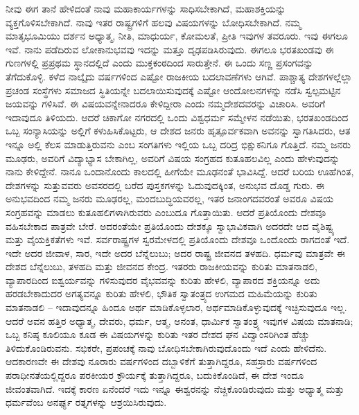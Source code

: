 ನೀವು ಈಗ ತಾನೆ ಹೇಳಿದಂತೆ ನಾವು ಮಹಾಕಾರ್ಯಗಳನ್ನು ಸಾಧಿಸಬೇಕಾಗಿದೆ, ಮಹಾಶಕ್ತಿಯನ್ನು ವ್ಯಕ್ತಗೊಳಿಸಬೇಕಾಗಿದೆ. ನಾವು ಇತರ ರಾಷ್ಟ್ರಗಳಿಗೆ ಹಲವು ವಿಷಯಗಳನ್ನು ಬೋಧಿಸಬೇಕಾಗಿದೆ. ನಮ್ಮ ಮಾತೃಭೂಮಿಯು ದರ್ಶನ ಅಧ್ಯಾತ್ಮ, ನೀತಿ, ಮಾಧುರ್ಯ, ಕೋಮಲತೆ, ಪ್ರೀತಿ ಇವುಗಳ ತವರೂರು. ಇವು ಈಗಲೂ ಇವೆ. ನಾನು ಪಡೆದಿರುವ ಲೋಕಾನುಭವವು ಇದನ್ನು ಮತ್ತೂ ದೃಢಪಡಿಸಿರುವುದು. ಈಗಲೂ ಭರತಖಂಡವು ಈ ಗುಣಗಳಲ್ಲಿ ಪ್ರಪ್ರಥಮ ಸ್ಥಾನದಲ್ಲಿದೆ ಎಂದು ಮುಕ್ತಕಂಠದಿಂದ ಸಾರುತ್ತೇನೆ. ಈ ಒಂದು ಸಣ್ಣ ಪ್ರಸಂಗವನ್ನು ತೆಗೆದುಕೊಳ್ಳಿ. ಕಳೆದ ನಾಲ್ಕೈದು ವರ್ಷಗಳಿಂದ ಎಷ್ಟೋ ರಾಜಕೀಯ ಬದಲಾವಣೆಗಳು ಆಗಿವೆ. ಪಾಶ್ಚಾತ್ಯ ದೇಶಗಳಲ್ಲೆಲ್ಲಾ ಪ್ರಚಂಡ ಸಂಸ್ಥೆಗಳು ಸಮಾಜದ ಸ್ಥಿತಿಯನ್ನೇ ಬದಲಾಯಿಸುವುದಕ್ಕೆ ಎಷ್ಟೋ ಆಂದೋಲನಗಳನ್ನು ನಡೆಸಿ ಸ್ವಲ್ಪಮಟ್ಟಿನ ಜಯವನ್ನು ಗಳಿಸಿವೆ. ಈ ವಿಷಯವನ್ನೇನಾದರೂ ಕೇಳಿದ್ದೀರಾ ಎಂದು ನಮ್ಮ\break ದೇಶದವರನ್ನು ವಿಚಾರಿಸಿ. ಅವರಿಗೆ ಇದಾವುದೂ ತಿಳಿಯದು. ಆದರೆ ಚಿಕಾಗೋ ನಗರದಲ್ಲಿ ಒಂದು ವಿಶ್ವಧರ್ಮ ಸಮ್ಮೇಳನ ನಡೆಯಿತು, ಭರತಖಂಡದಿಂದ ಒಬ್ಬ ಸಂನ್ಯಾಸಿಯನ್ನು ಅಲ್ಲಿಗೆ ಕಳುಹಿಸಿಕೊಟ್ಟರು, ಆ ದೇಶದ ಜನರು ಹೃತ್ಪೂರ್ವಕವಾಗಿ ಅವನನ್ನು ಸ್ವಾಗತಿಸಿದರು, ಆತ ಇನ್ನೂ ಅಲ್ಲಿ ಕೆಲಸ ಮಾಡುತ್ತಿರುವನು ಎಂಬ ಸಂಗತಿಗಳು ಇಲ್ಲಿಯ ಒಬ್ಬ ದರಿದ್ರ ಭಿಕ್ಷುಕನಿಗೂ ಗೊತ್ತಿದೆ. ನಮ್ಮ ಜನರು ಮೂಢರು, ಅವರಿಗೆ ವಿದ್ಯಾಭ್ಯಾಸ ಬೇಕಾಗಿಲ್ಲ, ಅವರಿಗೆ ವಿಷಯ ಸಂಗ್ರಹದ ಕುತೂಹಲವಿಲ್ಲ ಎಂದು ಹೇಳುವುದನ್ನು ನಾನು ಕೇಳಿದ್ದೇನೆ. ನಾನೂ ಒಂದಾನೊಂದು ಕಾಲದಲ್ಲಿ ಹೀಗೆಯೇ ಮೂಢನಂತೆ ಭಾವಿಸಿದ್ದೆ. ಆದರೆ ಬರಿಯ ಊಹೆಗಿಂತ, ದೇಶಗಳನ್ನು ಸುತ್ತುವವರು ಅವಸರದಲ್ಲಿ ಬರೆದ ಪುಸ್ತಕಗಳನ್ನು ಓದುವುದಕ್ಕಿಂತ, ಅನುಭವ ದೊಡ್ಡ ಗುರು. ಈ ಅನುಭವದಿಂದ ನಮ್ಮ ಜನರು ಮೂಢರಲ್ಲ, ಮಂದಬುದ್ಧಿಯವರಲ್ಲ, ಇತರ ಜನಾಂಗದವರಂತೆ ಅವರೂ ವಿಷಯ ಸಂಗ್ರಹವನ್ನು ಮಾಡಲು ಕುತೂಹಲಿಗಳಾಗಿರುವರು ಎಂಬುದೂ ಗೊತ್ತಾಯಿತು. ಆದರೆ ಪ್ರತಿಯೊಂದು ದೇಶವೂ ವಹಿಸಬೇಕಾದ ಪಾತ್ರವೇ ಬೇರೆ. ಅದರಂತೆಯೇ ಪ್ರತಿಯೊಂದು ದೇಶಕ್ಕೂ ಸ್ವಾಭಾವಿಕವಾಗಿ ಅದರದೇ ಆದ ವೈಶಿಷ್ಟ್ಯ ಮತ್ತು ವೈಯಕ್ತಿಕತೆಗಳು ಇವೆ. ಸರ್ವರಾಷ್ಟ್ರಗಳ ಸ್ವರಮೇಳದಲ್ಲಿ ಪ್ರತಿಯೊಂದು ದೇಶವೂ ಒಂದೊಂದು ರಾಗದಂತೆ ಇದೆ. ಇದೇ ಅದರ ಜೀವಾಳ, ಸಾರ, ಇದೇ ಅದರ ಬೆನ್ನೆಲುಬು; ಅದರ ರಾಷ್ಟ್ರ ಜೀವನದ ತಳಹದಿ. ಧರ್ಮವು ಮಾತ್ರವೇ ಈ ದೇಶದ ಬೆನ್ನೆಲುಬು, ತಳಹದಿ ಮತ್ತು ಜೀವನದ ಕೇಂದ್ರ. ಇತರರು ರಾಜಕೀಯವನ್ನು ಕುರಿತು ಮಾತನಾಡಲಿ, ವ್ಯಾಪಾರದಿಂದ ಐಶ್ವರ್ಯವನ್ನು ಗಳಿಸುವುದರ ವೈಭವವನ್ನು ಕುರಿತು ಹೇಳಲಿ, ವ್ಯಾಪಾರದ ಶಕ್ತಿಯನ್ನೂ ಅದು ಹರಡಬೇಕಾದುದರ ಅಗತ್ಯವನ್ನೂ ಕುರಿತು ಹೇಳಲಿ, ಭೌತಿಕ ಸ್ವಾತಂತ್ರ್ಯದ ಉಗಮದ ಮಹಿಮೆಯನ್ನು ಕುರಿತು ಮಾತ\-ನಾಡಲಿ – ಇದಾವುದನ್ನೂ ಹಿಂದೂ ಅರ್ಥ ಮಾಡಿಕೊಳ್ಳಲಾರ, ಅರ್ಥಮಾಡಿಕೊಳ್ಳುವುದಕ್ಕೆ ಇಚ್ಛಿಸುವುದೂ ಇಲ್ಲ. ಆದರೆ ಅವನ ಹತ್ತಿರ ಅಧ್ಯಾತ್ಮ, ದೇವರು, ಧರ್ಮ, ಆತ್ಮ, ಅನಂತ, ಧಾರ್ಮಿಕ ಸ್ವಾತಂತ್ರ್ಯ ಇವುಗಳ ವಿಷಯ ಮಾತನಾಡಿ; ಒಬ್ಬ ಕನಿಷ್ಠ ಕೂಲಿಯೂ ಕೂಡ ಈ ವಿಷಯಗಳನ್ನು ಕುರಿತು ಇತರ ದೇಶದ ಘನ ವಿದ್ವಾಂಸರಿಗಿಂತ ಹೆಚ್ಚು ತಿಳಿದುಕೊಂಡಿರುವನು. ಸಭಿಕರೇ, ಪ್ರಪಂಚಕ್ಕೆ ನಾವು ಬೋಧಿಸಬೇಕಾಗಿರುವುದೊಂದು ಇದೆ ಎಂದು ಹೇಳಿದೆನು. ಆದಕಾರಣವೇ ಈ ದೇಶವು ನೂರಾರು ವರ್ಷಗಳಿಂದ ದಬ್ಬಾಳಿಕೆಗೆ ತುತ್ತಾಗಿದ್ದರೂ, ಸಹಸ್ರಾರು ವರ್ಷಗಳಿಂದ ಪರಾಧೀನತೆಯಲ್ಲಿದ್ದರೂ ಪರಕೀಯರ ಕ್ರೌರ್ಯಕ್ಕೆ ತುತ್ತಾಗಿದ್ದರೂ, ಬದುಕಿಕೊಂಡಿದೆ, ಈ ದೇಶ ಇಂದೂ ಜೀವಂತವಾಗಿದೆ. ಇದಕ್ಕೆ ಕಾರಣ ಏನೆಂದರೆ ಇದು ಇನ್ನೂ ಈಶ್ವರನನ್ನು ನೆಚ್ಚಿಕೊಂಡಿರುವುದು ಮತ್ತು ಅಧ್ಯಾತ್ಮ ಮತ್ತು ಧರ್ಮವೆಂಬ ಅನರ್ಘ್ಯ ರತ್ನಗಳನ್ನು ಆಶ್ರಯಿಸಿರುವುದು.

